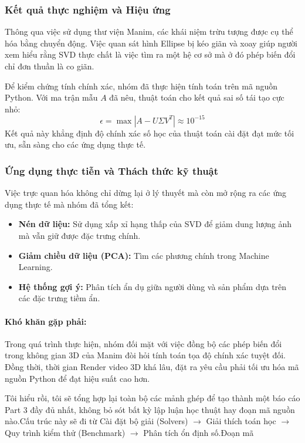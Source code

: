 \documentclass[a4paper,12pt]{article}
\begin{document}
\subsubsection{Kết quả thực nghiệm và Hiệu ứng}
Thông qua việc sử dụng thư viện Manim, các khái niệm trừu tượng được cụ thể hóa bằng chuyển động. Việc quan sát hình Ellipse bị kéo giãn và xoay giúp người xem hiểu rằng SVD thực chất là việc tìm ra một hệ cơ sở mà ở đó phép biến đổi chỉ đơn thuần là co giãn.

Để kiểm chứng tính chính xác, nhóm đã thực hiện tính toán trên mã nguồn Python. Với ma trận mẫu $A$ đã nêu, thuật toán cho kết quả sai số tái tạo cực nhỏ:
\begin{equation}
    \epsilon = \max|A - U\Sigma V^T| \approx 10^{-15}
\end{equation}
Kết quả này khẳng định độ chính xác số học của thuật toán cài đặt đạt mức tối ưu, sẵn sàng cho các ứng dụng thực tế.

\subsubsection{Ứng dụng thực tiễn và Thách thức kỹ thuật}
Việc trực quan hóa không chỉ dừng lại ở lý thuyết mà còn mở rộng ra các ứng dụng thực tế mà nhóm đã tổng kết:
\begin{itemize}
    \item \textbf{Nén dữ liệu:} Sử dụng xấp xỉ hạng thấp của SVD để giảm dung lượng ảnh mà vẫn giữ được đặc trưng chính.
    \item \textbf{Giảm chiều dữ liệu (PCA):} Tìm các phương chính trong Machine Learning.
    \item \textbf{Hệ thống gợi ý:} Phân tích ẩn dụ giữa người dùng và sản phẩm dựa trên các đặc trưng tiềm ẩn.
\end{itemize}

\paragraph{Khó khăn gặp phải:} Trong quá trình thực hiện, nhóm đối mặt với việc đồng bộ các phép biến đổi trong không gian 3D của Manim đòi hỏi tính toán tọa độ chính xác tuyệt đối. Đồng thời, thời gian Render video 3D khá lâu, đặt ra yêu cầu phải tối ưu hóa mã nguồn Python để đạt hiệu suất cao hơn.

Tôi hiểu rồi, tôi sẽ tổng hợp lại toàn bộ các mảnh ghép để tạo thành một báo cáo Part 3 đầy đủ nhất, không bỏ sót bất kỳ lập luận học thuật hay đoạn mã nguồn nào.Cấu trúc này sẽ đi từ Cài đặt bộ giải (Solvers) $\rightarrow$ Giải thích toán học $\rightarrow$ Quy trình kiểm thử (Benchmark) $\rightarrow$ Phân tích ổn định số.Đoạn mã
\end{document}
